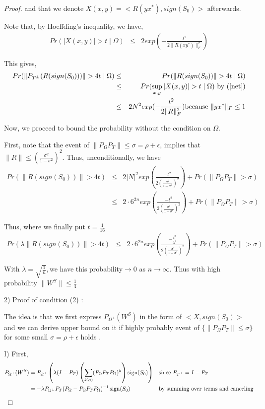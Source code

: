 \begin{proof}
and that we denote $X(x,y)=<R(yx^{*}),sign(S_{0})>$ afterwards.

Note that, by Hoeffding's inequality, we have,
\begin{eqnarray*}
Pr(|X(x,y)|>t\mid\Omega) & \le & 2exp(-\frac{t^{2}}{2\|R(xy^{*})\|_{F}^{2}})
\end{eqnarray*}


This gives,
\begin{eqnarray*}
Pr(\|P_{T^{\bot}}(R(sign(S_{0})))\|>4t\mid\Omega) & \le & Pr(\|R(sign(S_{0}))\|>4t\mid\Omega)\\
 & \le & Pr(\sup_{x,y}|X(x,y)|>t\mid\Omega) \text{ by (\ref{net})}\\
 & \le & 2N^{2}exp(-\frac{t^{2}}{2\|R\|_{F}^{2}})\text{because }\|yx^{*}\|_{F}\le1
\end{eqnarray*}


Now, we proceed to bound the probability without the condition on $\Omega$.

First, note that the event of $\|P_{\Omega}P_{T}\|\le\sigma=\rho+\epsilon$, implies that $\|R\|\le(\frac{\sigma^{2}}{1-\sigma^{2}})^{2}$. Thus, unconditionally, we have
\begin{eqnarray*}
Pr(\|R(sign(S_{0}))\|>4t) & \le & 2|N|^{2}exp(\frac{-t^{2}}{2(\frac{\sigma^{2}}{1-\sigma^{2}})^{2}})+Pr(\|P_{\Omega}P_{T}\|>\sigma)\\
 & \le & 2\cdot6^{2n}exp(\frac{-t^{2}}{2(\frac{\sigma^{2}}{1-\sigma^{2}})^{2}})+Pr(\|P_{\Omega}P_{T}\|>\sigma)
\end{eqnarray*}


Thus, where we finally put $t=\frac{1}{16}$
\begin{eqnarray*}
Pr(\lambda\|R(sign(S_{0}))\|>4t) & \le & 2\cdot6^{2n}exp(\frac{-\frac{t^{2}}{\lambda^{2}}}{2(\frac{\sigma^{2}}{1-\sigma^{2}})^{2}})+Pr(\|P_{\Omega}P_{T}\|>\sigma)
\end{eqnarray*}


With $\lambda=\sqrt{\frac{1}{n}},$we have this probability$\to0$ as $n\to\infty$. Thus with high probability $\|W^{S}\|\le\frac{1}{4}$

2) Proof of condition (2) :

The idea is that we first express $P_{\Omega^{\bot}}(W^{S})$ in the form of $<X,sign(S_{0})>$and we can derive upper bound on it if highly probably event of $\{\|P_{\Omega}P_{T}\|\le\sigma\}$ for some small $\sigma=\rho+\epsilon$ holds .

I) First,
\begin{align}
P_{\Omega^{\bot}}(W^{S}) 
& = P_{\Omega^{\bot}} \left( \lambda(I-P_{T}) \left( \sum_{k\ge0}(P_{\Omega}P_{T}P_{\Omega})^{k} \right) \operatorname{sign}(S_{0}) \right) 
&& \text{since } P_{T^{\bot}} = I- P_T\\
& = -\lambda P_{\Omega^{\bot}} P_{T}(P_{\Omega}-P_{\Omega}P_{T}P_{\Omega})^{-1} \operatorname{sign}(S_{0}) 
&&\text{by  summing over terms and canceling} 
\label{wsp1}
\end{align}



\end{proof}
